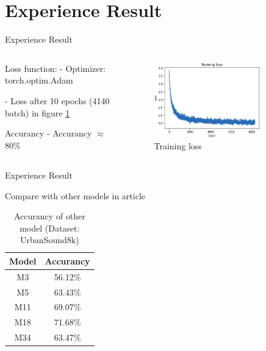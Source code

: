 \section{Experience Result}

\begin{frame}{Experience Result}
  \begin{columns}
    \begin{column}{0.4\textwidth}
      \begin{block}{Loss function:}
        - Optimizer: torch.optim.Adam

        - Loss after 10 epochs (4140 batch) in figure \ref{fig:loss}
      \end{block}
      \begin{block}{Accurancy}
        - Accurancy \(\approx\) 80\%
      \end{block}
    \end{column}{}
    \begin{column}{0.6\textwidth}
      \begin{figure}
        \includegraphics[width=0.8\textwidth]{figure/loss.png}
        \caption{Training loss}
        \label{fig:loss}
      \end{figure}
    \end{column}
  \end{columns}
\end{frame}

\begin{frame}{Experience Result}
  \begin{block}{Compare with other models in article}
    \begin{table}
     \begin{tabular}{|c | c|} 
     \hline
     \textbf{Model} & \textbf{Accurancy} \\ [0.5ex] 
     \hline\hline
     M3 & 56.12\% \\ 
     \hline
     M5 & 63.43\% \\
     \hline
     M11 & 69.07\% \\
     \hline
     M18 & 71.68\% \\
     \hline
     M34 & 63.47\% \\ [1ex] 
     \hline
    \end{tabular}
    \caption{Accurancy of other model (Dataset: UrbanSound8k)}
    \end{table}
  \end{block}
\end{frame}